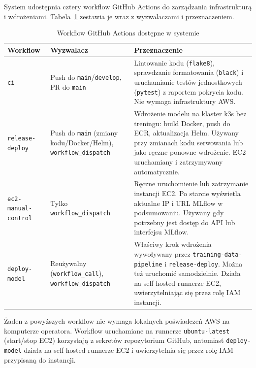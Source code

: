 System udostępnia cztery workflow GitHub Actions do zarządzania infrastrukturą i wdrożeniami. Tabela~\ref{tab:workflows} zestawia je wraz z wyzwalaczami i przeznaczeniem.

\begin{table}[H]
\centering
\caption{Workflow GitHub Actions dostępne w systemie}
\label{tab:workflows}
\begin{tabular}{|p{4.2cm}|p{3.2cm}|p{6.5cm}|}
\hline
\textbf{Workflow} & \textbf{Wyzwalacz} & \textbf{Przeznaczenie} \\
\hline
\texttt{ci} & Push do \texttt{main}/\texttt{develop}, PR do \texttt{main} & Lintowanie kodu (\texttt{flake8}), sprawdzanie formatowania (\texttt{black}) i uruchamianie testów jednostkowych (\texttt{pytest}) z raportem pokrycia kodu. Nie wymaga infrastruktury AWS. \\
\hline
\texttt{release-deploy} & Push do \texttt{main} (zmiany kodu/Docker/Helm), \texttt{workflow\_dispatch} & Wdrożenie modelu na klaster k3s bez treningu: build Docker, push do ECR, aktualizacja Helm. Używany przy zmianach kodu serwowania lub jako ręczne ponowne wdrożenie. EC2 uruchamiany i zatrzymywany automatycznie. \\
\hline
\texttt{ec2-manual-control} & Tylko \texttt{workflow\_dispatch} & Ręczne uruchomienie lub zatrzymanie instancji EC2. Po starcie wyświetla aktualne IP i URL MLflow w podsumowaniu. Używany gdy potrzebny jest dostęp do API lub interfejsu MLflow. \\
\hline
\texttt{deploy-model} & Reużywalny (\texttt{workflow\_call}), \texttt{workflow\_dispatch} & Właściwy krok wdrożenia wywoływany przez \texttt{training-data-pipeline} i \texttt{release-deploy}. Można też uruchomić samodzielnie. Działa na self-hosted runnerze EC2, uwierzytelniając się przez rolę IAM instancji. \\
\hline
\end{tabular}
\end{table}

Żaden z powyższych workflow nie wymaga lokalnych poświadczeń AWS na komputerze operatora. Workflow uruchamiane na runnerze \texttt{ubuntu-latest} (start/stop EC2) korzystają z sekretów repozytorium GitHub, natomiast \texttt{deploy-model} działa na self-hosted runnerze EC2 i uwierzytelnia się przez rolę IAM przypisaną do instancji.

